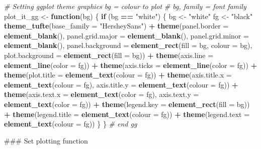 \documentclass[10,portrait]{article}
\newenvironment{Shaded}{\begin{snugshade}}{\end{snugshade}}
\newcommand{\KeywordTok}[1]{\textcolor[rgb]{0.13,0.29,0.53}{\textbf{#1}}}
\newcommand{\DataTypeTok}[1]{\textcolor[rgb]{0.13,0.29,0.53}{#1}}
\newcommand{\StringTok}[1]{\textcolor[rgb]{0.31,0.60,0.02}{#1}}
\newcommand{\CommentTok}[1]{\textcolor[rgb]{0.56,0.35,0.01}{\textit{#1}}}
\newcommand{\ControlFlowTok}[1]{\textcolor[rgb]{0.13,0.29,0.53}{\textbf{#1}}}
\newcommand{\OperatorTok}[1]{\textcolor[rgb]{0.81,0.36,0.00}{\textbf{#1}}}
\newcommand{\NormalTok}[1]{#1}
\begin{document}
\begin{Shaded}
\begin{Highlighting}[]
\CommentTok{# Setting ggplot theme graphics bg = colour to plot}
\CommentTok{# bg, family = font family}
\NormalTok{plot_it_gg <-}\StringTok{ }\ControlFlowTok{function}\NormalTok{(bg) \{}
    \ControlFlowTok{if}\NormalTok{ (bg }\OperatorTok{==}\StringTok{ "white"}\NormalTok{) \{}
\NormalTok{        bg <-}\StringTok{ "white"}
\NormalTok{        fg <-}\StringTok{ "black"}
        \KeywordTok{theme_tufte}\NormalTok{(}\DataTypeTok{base_family =} \StringTok{"HersheySans"}\NormalTok{) }\OperatorTok{+}\StringTok{ }
\StringTok{            }\KeywordTok{theme}\NormalTok{(}\DataTypeTok{panel.border =} \KeywordTok{element_blank}\NormalTok{(), }\DataTypeTok{panel.grid.major =} \KeywordTok{element_blank}\NormalTok{(), }
                \DataTypeTok{panel.grid.minor =} \KeywordTok{element_blank}\NormalTok{(), }
                \DataTypeTok{panel.background =} \KeywordTok{element_rect}\NormalTok{(}\DataTypeTok{fill =}\NormalTok{ bg, }
                  \DataTypeTok{colour =}\NormalTok{ bg), }\DataTypeTok{plot.background =} \KeywordTok{element_rect}\NormalTok{(}\DataTypeTok{fill =}\NormalTok{ bg)) }\OperatorTok{+}\StringTok{ }
\StringTok{            }\KeywordTok{theme}\NormalTok{(}\DataTypeTok{axis.line =} \KeywordTok{element_line}\NormalTok{(}\DataTypeTok{color =}\NormalTok{ fg)) }\OperatorTok{+}\StringTok{ }
\StringTok{            }\KeywordTok{theme}\NormalTok{(}\DataTypeTok{axis.ticks =} \KeywordTok{element_line}\NormalTok{(}\DataTypeTok{color =}\NormalTok{ fg)) }\OperatorTok{+}\StringTok{ }
\StringTok{            }\KeywordTok{theme}\NormalTok{(}\DataTypeTok{plot.title =} \KeywordTok{element_text}\NormalTok{(}\DataTypeTok{colour =}\NormalTok{ fg)) }\OperatorTok{+}\StringTok{ }
\StringTok{            }\KeywordTok{theme}\NormalTok{(}\DataTypeTok{axis.title.x =} \KeywordTok{element_text}\NormalTok{(}\DataTypeTok{colour =}\NormalTok{ fg), }
                \DataTypeTok{axis.title.y =} \KeywordTok{element_text}\NormalTok{(}\DataTypeTok{colour =}\NormalTok{ fg)) }\OperatorTok{+}\StringTok{ }
\StringTok{            }\KeywordTok{theme}\NormalTok{(}\DataTypeTok{axis.text.x =} \KeywordTok{element_text}\NormalTok{(}\DataTypeTok{color =}\NormalTok{ fg), }
                \DataTypeTok{axis.text.y =} \KeywordTok{element_text}\NormalTok{(}\DataTypeTok{color =}\NormalTok{ fg)) }\OperatorTok{+}\StringTok{ }
\StringTok{            }\KeywordTok{theme}\NormalTok{(}\DataTypeTok{legend.key =} \KeywordTok{element_rect}\NormalTok{(}\DataTypeTok{fill =}\NormalTok{ bg)) }\OperatorTok{+}\StringTok{ }
\StringTok{            }\KeywordTok{theme}\NormalTok{(}\DataTypeTok{legend.title =} \KeywordTok{element_text}\NormalTok{(}\DataTypeTok{colour =}\NormalTok{ fg)) }\OperatorTok{+}\StringTok{ }
\StringTok{            }\KeywordTok{theme}\NormalTok{(}\DataTypeTok{legend.text =} \KeywordTok{element_text}\NormalTok{(}\DataTypeTok{colour =}\NormalTok{ fg))}
\NormalTok{    \}}
\NormalTok{\}  }\CommentTok{# end gg}

\NormalTok{### Set plotting function}
\end{Highlighting}
\end{Shaded}
\end{document}
